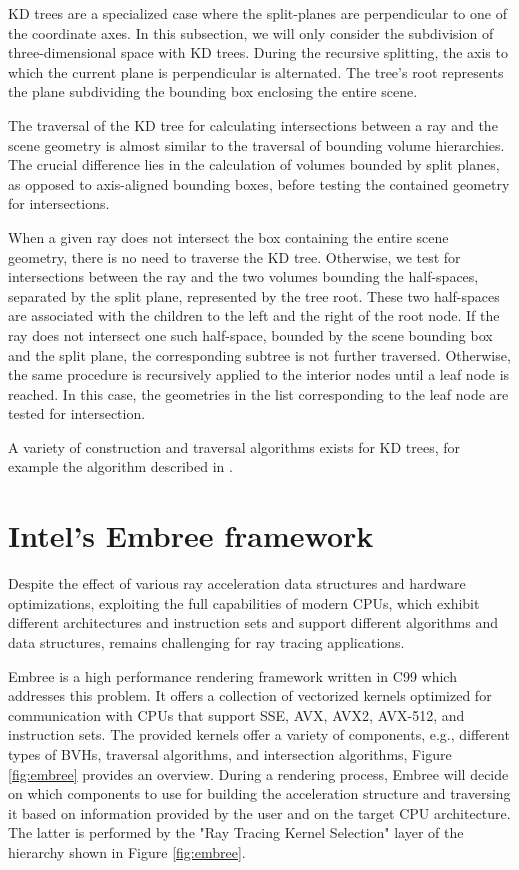 KD trees are a specialized case where the split-planes are perpendicular to one of the coordinate axes. In this subsection, we will only consider the subdivision of three-dimensional space with KD trees. During the recursive splitting, the axis to which the current plane is perpendicular is alternated. The tree's root represents the plane subdividing the bounding box enclosing the entire scene.

The traversal of the KD tree for calculating intersections between a ray and the scene geometry is almost similar to the traversal of bounding volume hierarchies. The crucial difference lies in the calculation of volumes bounded by split planes, as opposed to axis-aligned bounding boxes, before testing the contained geometry for intersections.

When a given ray does not intersect the box containing the entire scene geometry, there is no need to traverse the KD tree. Otherwise, we test for intersections between the ray and the two volumes bounding the half-spaces, separated by the split plane, represented by the tree root. These two half-spaces are associated with the children to the left and the right of the root node. If the ray does not intersect one such half-space, bounded by the scene bounding box and the split plane, the corresponding subtree is not further traversed. Otherwise, the same procedure is recursively applied to the interior nodes until a leaf node is reached. In this case, the geometries in the list corresponding to the leaf node are tested for intersection.

A variety of construction and traversal algorithms exists for KD trees, for example the algorithm described in \cite{wald2006building}.


\section{Intel's Embree framework}
Despite the effect of various ray acceleration data structures and hardware optimizations, exploiting the full capabilities of modern CPUs, which exhibit different architectures and instruction sets and support different algorithms and data structures, remains challenging for ray tracing applications.

Embree is a high performance rendering framework written in C99 which addresses this problem. It offers a collection of vectorized kernels optimized for communication with CPUs that support SSE, AVX, AVX2, AVX-512, and instruction sets. The provided kernels offer a variety of components, e.g., different types of BVHs, traversal algorithms, and intersection algorithms, Figure \ref{fig:embree} provides an overview.
During a rendering process, Embree will decide on which components to use for building the acceleration structure and traversing it based on information provided by the user and on the target CPU architecture. The latter is performed by the "Ray Tracing Kernel Selection" layer of the hierarchy shown in Figure \ref{fig:embree}.
\\

